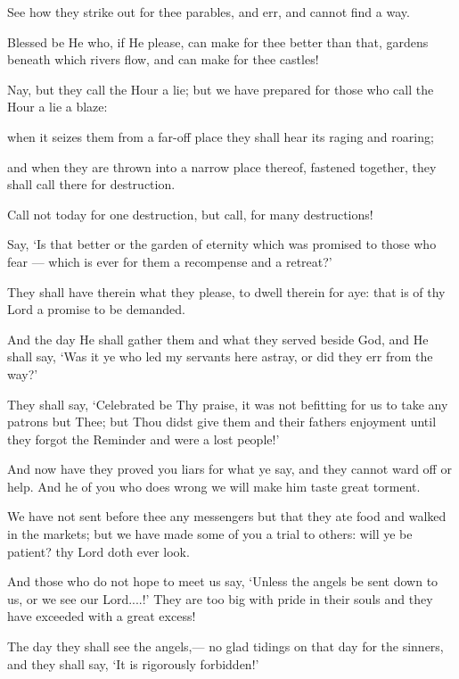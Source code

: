 \documentclass[fontsize=14pt, letterpaper, notitlepage, openany, DIV=12]{scrbook} %
\begin{document}
\noindent[25:9]
See how they strike out for thee parables, and err, and cannot find a way.

\noindent[25:10]
Blessed be He who, if He please, can make for thee better than that, gardens beneath
which rivers flow, and can make for thee castles!

\noindent[25:11]
Nay, but they call the Hour a lie; but we have prepared for those who call the Hour a lie a
blaze:

\noindent[25:12]
when it seizes them from a far-off place they shall hear its raging and roaring;

\noindent[25:13]
and when they are thrown into a narrow place thereof, fastened together, they shall call
there for destruction.

\noindent[25:14]
Call not today for one destruction, but call, for many destructions!

\noindent[25:15]
Say, `Is that better or the garden of eternity which was promised to those who fear ---
which is ever for them a recompense and a retreat?'

\noindent[25:16]
They shall have therein what they please, to dwell therein for aye: that is of thy Lord a
promise to be demanded.

\noindent[25:17]
And the day He shall gather them and what they served beside God, and He shall say,
`Was it ye who led my servants here astray, or did they err from the way?'

\noindent[25:18]
They shall say, `Celebrated be Thy praise, it was not befitting for us to take any patrons
but Thee; but Thou didst give them and their fathers enjoyment until they forgot the Reminder
and were a lost people!'

\noindent[25:19]
And now have they proved you liars for what ye say, and they cannot ward off or help.
And he of you who does wrong we will make him taste great torment.

\noindent[25:20]
We have not sent before thee any messengers but that they ate food and walked in the
markets; but we have made some of you a trial to others: will ye be patient? thy Lord doth ever
look.

\noindent[25:21]
And those who do not hope to meet us say, `Unless the angels be sent down to us, or we
see our Lord....!' They are too big with pride in their souls and they have exceeded with a great
excess!

\noindent[25:22]
The day they shall see the angels,--- no glad tidings on that day for the sinners, and they
shall say, `It is rigorously forbidden!'
\end{document}
